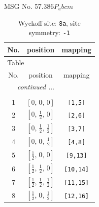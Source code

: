 \documentclass[fleqn,8pt]{jsarticle}
\begin{document}
\setcounter{MaxMatrixCols}{32}

\renewcommand{\tablename}{Table~}
\renewcommand{\figurename}{Figure~}
\begin{center}
\LARGE
MSG No. 57.386\quad$P_{a}bcm$
\end{center}
\renewcommand{\arraystretch}{1.2}
\begin{longtable}{ccc}
\caption{Wyckoff site: {\tt 8a}, site symmetry: {\tt -1}}
 \\
 \hline \hline
No. & position & mapping \\ \hline \endfirsthead

\multicolumn{2}{l}{\tablename\ \thetable{}} \\
 \hline \hline
No. & position & mapping \\ \hline \endhead

 \hline \hline
\multicolumn{2}{r}{\footnotesize\it continued ...} \\ \endfoot

 \hline \hline
\multicolumn{2}{r}{} \\ \endlastfoot

1 & $\left[ 0,\, 0,\, 0 \right]$ & {\tt [1,5]} \\ \hline
2 & $\left[ 0,\, \frac{1}{2},\, 0 \right]$ & {\tt [2,6]} \\ \hline
3 & $\left[ 0,\, \frac{1}{2},\, \frac{1}{2} \right]$ & {\tt [3,7]} \\ \hline
4 & $\left[ 0,\, 0,\, \frac{1}{2} \right]$ & {\tt [4,8]} \\ \hline
5 & $\left[ \frac{1}{2},\, 0,\, 0 \right]$ & {\tt [9,13]} \\ \hline
6 & $\left[ \frac{1}{2},\, \frac{1}{2},\, 0 \right]$ & {\tt [10,14]} \\ \hline
7 & $\left[ \frac{1}{2},\, \frac{1}{2},\, \frac{1}{2} \right]$ & {\tt [11,15]} \\ \hline
8 & $\left[ \frac{1}{2},\, 0,\, \frac{1}{2} \right]$ & {\tt [12,16]} \\
\end{longtable}
\renewcommand{\arraystretch}{1.2}
\end{document}
